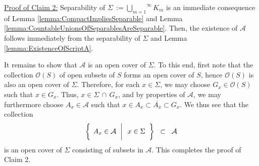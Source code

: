 \vskip 0.5cm
\noindent
\underline{Proof of Claim 2:}\quad
Separability of $\Sigma \,:= \overset{\infty}{\underset{m=1}{\bigcup}}K_{m}$
is an immediate consequence of
Lemma \ref{lemma:CompactImpliesSeparable} and
Lemma \ref{lemma:CountableUnionsOfSeparablesAreSeparable}.
Then, the existence of $\mathcal{A}$ follows immediately
from the separability of $\Sigma$
and Lemma \ref{lemma:ExistenceOfScriptA}.

\vskip 0.3cm
\noindent
It remains to show that $\mathcal{A}$ is an open cover of $\Sigma$.
To this end, first note that the collection $\mathcal{O}(S)$ of open subsets of $S$
forms an open cover of $S$, hence $\mathcal{O}(S)$ is also an open cover of $\Sigma$.
Therefore, for each $x \in \Sigma$, we may choose $G_{x} \in \mathcal{O}(S)$
such that $x \in G_{x}$.
Thus, $x \in \Sigma\,\cap\,G_{x}$, and by properties of $\mathcal{A}$,
we may furthermore choose $A_{x} \in \mathcal{A}$ such that
$x \in A_{x} \subset \overline{A_{x}} \subset G_{x}$.
We thus see that the collection
\begin{equation*}
\left\{\;
\left.
A_{x} \in \overset{{\color{white}u}}{\mathcal{A}}
\;\;\right\vert\;\;
x \in \Sigma
\;\;\right\}
\;\; \subset \;\; \mathcal{A}
\end{equation*}
is an open cover of $\Sigma$ consisting of subsets in $\mathcal{A}$.
This completes the proof of Claim 2.

